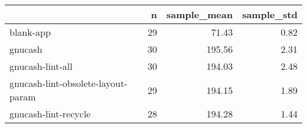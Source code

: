 \begin{tabular}{lrrr}
\toprule
{} &   n &  sample\_mean &  sample\_std \\
\midrule
blank-app                          &  29 &        71.43 &        0.82 \\
gnucash                            &  30 &       195.56 &        2.31 \\
gnucash-lint-all                   &  30 &       194.03 &        2.48 \\
gnucash-lint-obsolete-layout-param &  29 &       194.15 &        1.89 \\
gnucash-lint-recycle               &  28 &       194.28 &        1.44 \\
\bottomrule
\end{tabular}

